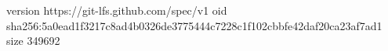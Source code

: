 version https://git-lfs.github.com/spec/v1
oid sha256:5a0ead1f3217c8ad4b0326de3775444c7228c1f102cbbfe42daf20ca23af7ad1
size 349692

